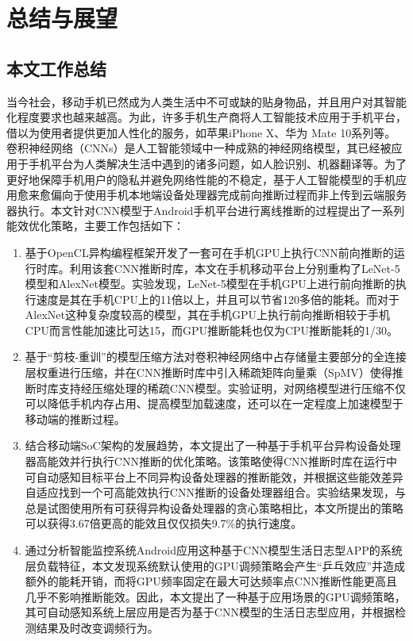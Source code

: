 \chapter{总结与展望}

\section{本文工作总结}
当今社会，移动手机已然成为人类生活中不可或缺的贴身物品，并且用户对其智能化程度要求也越来越高。为此，许多手机生产商将人工智能技术应用于手机平台，借以为使用者提供更加人性化的服务，如苹果iPhone X、华为 Mate 10系列等。卷积神经网络（CNNs）是人工智能领域中一种成熟的神经网络模型，其已经被应用于手机平台为人类解决生活中遇到的诸多问题，如人脸识别、机器翻译等。为了更好地保障手机用户的隐私并避免网络性能的不稳定，基于人工智能模型的手机应用愈来愈偏向于使用手机本地端设备处理器完成前向推断过程而非上传到云端服务器执行。本文针对CNN模型于Android手机平台进行离线推断的过程提出了一系列能效优化策略，主要工作包括如下：
\begin{enumerate}
  \item 基于OpenCL异构编程框架开发了一套可在手机GPU上执行CNN前向推断的运行时库。利用该套CNN推断时库，本文在手机移动平台上分别重构了LeNet-5模型和AlexNet模型。实验发现，LeNet-5模型在手机GPU上进行前向推断的执行速度是其在手机CPU上的11倍以上，并且可以节省120多倍的能耗。而对于AlexNet这种复杂度较高的模型，其在手机GPU上执行前向推断相较于手机CPU而言性能加速比可达15，而GPU推断能耗也仅为CPU推断能耗的1/30。
  \item 基于“剪枝-重训”的模型压缩方法对卷积神经网络中占存储量主要部分的全连接层权重进行压缩，并在CNN推断时库中引入稀疏矩阵向量乘（SpMV）使得推断时库支持经压缩处理的稀疏CNN模型。实验证明，对网络模型进行压缩不仅可以降低手机内存占用、提高模型加载速度，还可以在一定程度上加速模型于移动端的推断过程。
  \item 结合移动端SoC架构的发展趋势，本文提出了一种基于手机平台异构设备处理器高能效并行执行CNN推断的优化策略。该策略使得CNN推断时库在运行中可自动感知目标平台上不同异构设备处理器的推断能效，并根据这些能效差异自适应找到一个可高能效执行CNN推断的设备处理器组合。实验结果发现，与总是试图使用所有可获得异构设备处理器的贪心策略相比，本文所提出的策略可以获得3.67倍更高的能效且仅仅损失9.7\%的执行速度。
  \item 通过分析智能监控系统Android应用这种基于CNN模型生活日志型APP的系统层负载特征，本文发现系统默认使用的GPU调频策略会产生“乒乓效应”并造成额外的能耗开销，而将GPU频率固定在最大可达频率点CNN推断性能更高且几乎不影响推断能效。因此，本文提出了一种基于应用场景的GPU调频策略，其可自动感知系统上层应用是否为基于CNN模型的生活日志型应用，并根据检测结果及时改变调频行为。
\end{enumerate}


